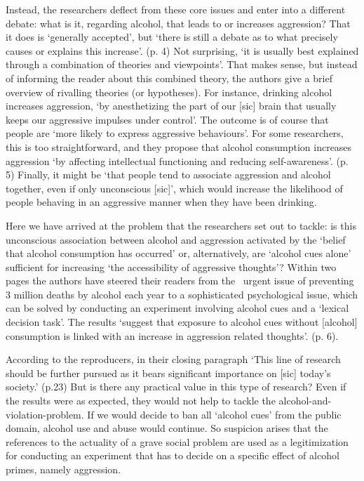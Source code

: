 \documentclass[twocolumn, serif, review, authordate]{jote-article}
\begin{document}
Instead, the researchers deflect from these core issues and enter into a different debate: what is it, regarding alcohol, that leads to or increases aggression? That it does is `generally accepted', but `there is still a debate as to what precisely causes or explains this increase'. (p. 4) Not surprising, `it is usually best explained through a combination of theories and viewpoints'. That makes sense, but instead of informing the reader about this combined theory, the authors give a brief overview of rivalling theories (or hypotheses). For instance, drinking alcohol increases aggression, `by anesthetizing the part of our [sic] brain that usually keeps our aggressive impulses under control'. The outcome is of course that people are `more likely to express aggressive behaviours'. For some researchers, this is too straightforward, and they propose that alcohol consumption increases aggression `by affecting intellectual functioning and reducing self-awareness'. (p. 5) Finally, it might be `that people tend to associate aggression and alcohol together, even if only unconscious [sic]', which would increase the likelihood of people behaving in an aggressive manner when they have been drinking.

Here we have arrived at the problem that the researchers set out to tackle: is this unconscious association between alcohol and aggression activated by the `belief that alcohol consumption has occurred' or, alternatively, are `alcohol cues alone' sufficient for increasing `the accessibility of aggressive thoughts'? Within two pages the authors have steered their readers from the \ urgent issue of preventing 3 million deaths by alcohol each year to a sophisticated psychological issue, which can be solved by conducting an experiment involving alcohol cues and a `lexical decision task'. The results `suggest that exposure to alcohol cues without [alcohol] consumption is linked with an increase in aggression related thoughts'. (p. 6).

According to the reproducers, in their closing paragraph `This line of research should be further pursued as it bears significant importance on [sic] today's society.' (p.23) But is there any practical value in this type of research? Even if the results were as expected, they would not help to tackle the alcohol-and-violation-problem. If we would decide to ban all `alcohol cues' from the public domain, alcohol use and abuse would continue. So suspicion arises that the references to the actuality of a grave social problem are used as a legitimization for conducting an experiment that has to decide on a specific effect of alcohol primes, namely aggression.
\end{document}

